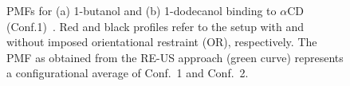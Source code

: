 \documentclass[9pt,lessons]{livecoms}
\begin{document}
\begin{figure}[htb!]
  \centering    
  \caption{PMFs for (a) 1-butanol and (b) 1-dodecanol binding to $\alpha$CD (Conf.1)~\cite{markthaler2017molecular, gebhardt2016calculation}. 
  Red and black profiles refer to the setup with and without imposed orientational restraint (OR), respectively.
  The PMF as obtained from the RE-US approach (green curve) represents a configurational average of Conf.~1 and Conf.~2.
  }
  \label{fig:PMF_aCD}
\end{figure}
\end{document}
